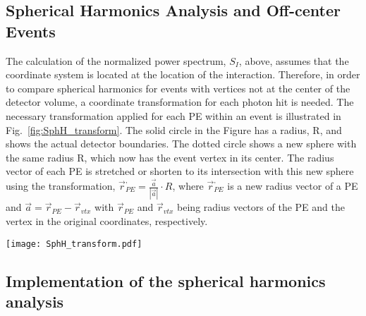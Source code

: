 \subsection{Spherical Harmonics Analysis and Off-center Events}

The calculation of the normalized power spectrum, $S_I$, above, assumes that the coordinate system is located at the location of the interaction.  Therefore, in order to compare spherical harmonics for events with vertices not at the center of the detector volume, a coordinate transformation for each photon hit is needed. The necessary transformation applied for each PE within an event is illustrated in Fig.~\ref{fig:SphH_transform}. The solid circle in the Figure has a radius, R, and shows the actual detector boundaries. The dotted circle shows a new sphere with the same radius R, which now has the event vertex in its center. The radius vector of each PE is stretched or shorten to its intersection with this new sphere using the transformation, $\vec{r}^{,}_{PE} = \frac{\vec{a}}{|\vec{a}|} \cdot R$, where $\vec{r}^{,}_{PE}$ is a new radius vector of a PE and $\vec{a}=\vec{r}_{PE} - \vec{r}_{vtx}$ with $\vec{r}_{PE}$ and $\vec{r}_{vtx}$ being radius vectors of the PE and the vertex in the original coordinates, respectively.

\begin{figure*}[h]
  \centering
  \texttt{[image: SphH\_transform.pdf]}
  \caption{Coordinate transformation applied to events that are
    off-center. Solid circle schematically shows actual detector
    boundaries. Dotted circle shows a new sphere of radius R$=$6.5~m
    with the event vertex position in the center. The radius vector of
    each photon hit is stretched or shorten until intersection with
    this new sphere using transformation $\vec{r}^{,}_{hit} =
    \frac{\vec{a}}{|\vec{a}|} \cdot R$. Where $\vec{r}^{,}_{hit}$ is a
    new radius vector of the photon hit, $R$ is detector sphere radius,
    and $\vec{a}=\vec{r}_{hit} - \vec{r}_{vtx}$ with $\vec{r}_{hit}$
    and $\vec{r}_{vtx}$ being radius vectors of the photon hit and
    vertex position in original coordinates and correspondingly.}
  \label{fig:SphH_transform}
\end{figure*}


\subsection{Implementation of the spherical harmonics analysis}


